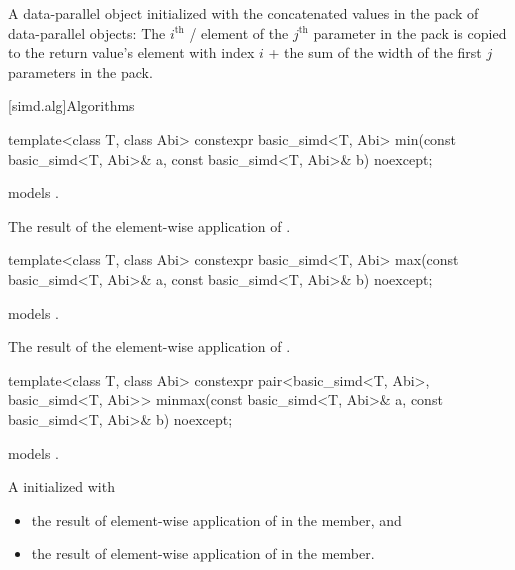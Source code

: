 \begin{itemdescr}
  \pnum\returns
  A data-parallel object initialized with the concatenated values in the  pack of
  data-parallel objects: The $i^\text{th}$ / element of the
  $j^\text{th}$ parameter in the  pack is copied to the return value's element with index
  $i$ + the sum of the width of the first $j$ parameters in the  pack.
\end{itemdescr}

[simd.alg]{Algorithms}

\begin{itemdecl}
template<class T, class Abi>
  constexpr basic_simd<T, Abi> min(const basic_simd<T, Abi>& a, const basic_simd<T, Abi>& b) noexcept;
\end{itemdecl}

\begin{itemdescr}
  \pnum\constraints
   models .

  \pnum\returns
  The result of the element-wise application of  \foralli.
\end{itemdescr}

\begin{itemdecl}
template<class T, class Abi>
  constexpr basic_simd<T, Abi> max(const basic_simd<T, Abi>& a, const basic_simd<T, Abi>& b) noexcept;
\end{itemdecl}

\begin{itemdescr}
  \pnum\constraints
   models .

  \pnum\returns
  The result of the element-wise application of  \foralli.
\end{itemdescr}

\begin{itemdecl}
template<class T, class Abi>
  constexpr pair<basic_simd<T, Abi>, basic_simd<T, Abi>>
  minmax(const basic_simd<T, Abi>& a, const basic_simd<T, Abi>& b) noexcept;
\end{itemdecl}

\begin{itemdescr}
  \pnum\constraints
   models .

  \pnum\returns
  A  initialized with
  \begin{itemize}
    \item the result of element-wise application of  \foralli{} in
      the  member, and
    \item the result of element-wise application of  \foralli{} in
      the  member.
  \end{itemize}
\end{itemdescr}

